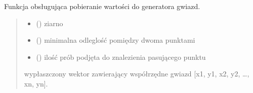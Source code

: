 \documentclass[a4paper,10pt,openany,english]{sphinxmanual}
\begin{document}

\begin{fulllineitems}
\label{\detokenize{js/js-functions:starsGenerator}}
\pysigstartsignatures
\pysiglinewithargsret
{}
{\sphinxparamcomma {}\sphinxparamcomma {}}
{}
\pysigstopsignatures
\sphinxAtStartPar
Funkcja obsługująca pobieranie wartości do generatora gwiazd.
\begin{quote}\begin{description}
\begin{itemize}
\item {} 
\sphinxAtStartPar
{} () \textendash{} ziarno

\item {} 
\sphinxAtStartPar
{} () \textendash{} minimalna odleglość pomiędzy dwoma punktami

\item {} 
\sphinxAtStartPar
{} () \textendash{} ilość prób podjęta do znalezienia pasującego punktu

\end{itemize}

\sphinxAtStartPar
wypłaszczony wektor zawierający współrzędne gwiazd {[}x1, y1, x2, y2, …, xn, yn{]}.

\end{description}\end{quote}

\end{fulllineitems}

\end{document}
